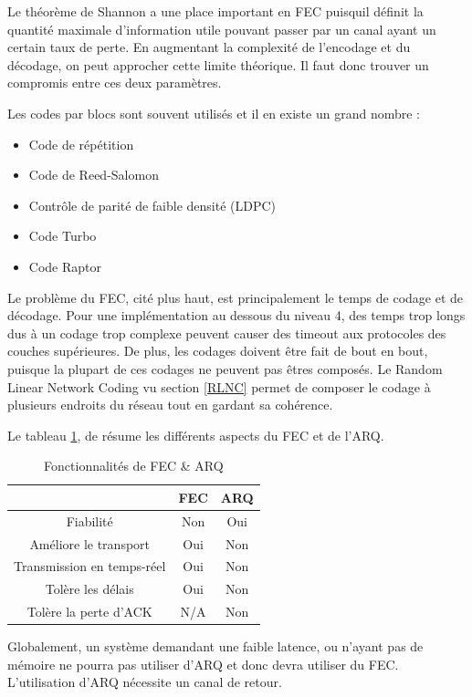 \documentclass[frenchb]{article}
\begin{document}
Le théorème de Shannon a une place important en FEC puisquil définit la quantité maximale d'information utile pouvant passer par un canal ayant un certain taux de perte. En augmentant la complexité de l'encodage et du décodage, on peut approcher cette limite théorique. Il faut donc trouver un compromis entre ces deux paramètres.

Les codes par blocs sont souvent utilisés et il en existe un grand nombre :
\begin{itemize}
\item Code de répétition
\item Code de Reed-Salomon
\item Contrôle de parité de faible densité (LDPC)
\item Code Turbo
\item Code Raptor
\end{itemize}


Le problème du FEC, cité plus haut, est principalement le temps de codage et de décodage. Pour une implémentation au dessous du niveau 4, des temps trop longs dus à un codage trop complexe peuvent causer des timeout aux protocoles des couches supérieures. De plus, les codages doivent être fait de bout en bout, puisque la plupart de ces codages ne peuvent pas êtres composés. Le Random Linear Network Coding vu section \ref{RLNC} permet de composer le codage à plusieurs endroits du réseau tout en gardant sa cohérence.


Le tableau \ref{table:fecarq}, de \cite{feqarqtable} résume les différents aspects du FEC et de l'ARQ. \\ 
\begin{table}[H]
  \centering
  \begin{tabular}{|c|c|c|}
    \hline
    & \textbf{FEC} & \textbf{ARQ} \\
    \hline
    Fiabilité & Non & Oui\\
    \hline
    Améliore le transport & Oui & Non\\
    \hline
    Transmission en temps-réel & Oui & Non\\
    \hline
    Tolère les délais & Oui & Non\\
    \hline
    Tolère la perte d'ACK & N/A & Non\\
    \hline
  \end{tabular}
  \caption{Fonctionnalités de FEC \& ARQ}
  \label{table:fecarq}
\end{table}

Globalement, un système demandant une faible latence, ou n'ayant pas de mémoire ne pourra pas utiliser d'ARQ et donc devra utiliser du FEC. L'utilisation d'ARQ nécessite un canal de retour.
\end{document}
